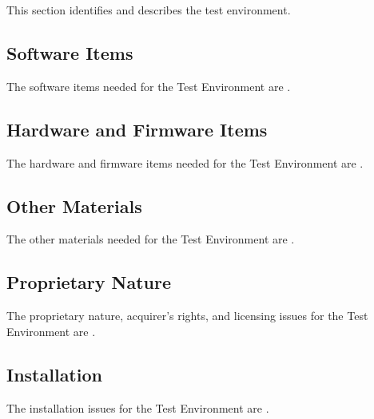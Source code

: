 


This section identifies and describes the \TestEnvName\xspace test environment.

\subsection{Software Items}
\label{loc:Software\TestEnvName}


The software items needed for the \TestEnvName\xspace Test Environment are \TBD.


\subsection{Hardware and Firmware Items}
\label{loc:Hardware\TestEnvName}


The hardware and firmware items needed for the \TestEnvName\xspace Test Environment are \TBD.


\subsection{Other Materials}
\label{loc:OtherMaterials\TestEnvName}


The other materials needed for the \TestEnvName\xspace Test Environment are \TBD.


\subsection{Proprietary Nature}
\label{loc:ProprietaryNature\TestEnvName}


The proprietary nature, acquirer’s rights, and licensing issues for the \TestEnvName\xspace Test Environment are \TBD.


\subsection{Installation}
\label{loc:Installation\TestEnvName}


The installation issues for the \TestEnvName\xspace Test Environment are \TBD.


